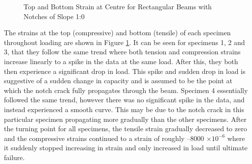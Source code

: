 \documentclass[11pt,a4paper]{article}
\numberwithin{equation}{subsection}
\begin{document}
\begin{figure}[h]
	\begin{center}
	\end{center}
	\caption{Top and Bottom Strain at Centre for Rectangular Beams with Notches of Slope 1:0}
	\label{fig:Rect_10_centre}
\end{figure}

\pagebreak

\noindent
The strains at the top (compressive) and bottom (tensile) of each specimen throughout loading are shown in Figure \ref{fig:Rect_10_centre}. It can be seen for specimens 1, 2 and 3, that they follow the same trend where both tension and compression strains increase linearly to a spike in the data at the same load. After this, they both then experience a significant drop in load. This spike and sudden drop in load is suggestive of a sudden change in capacity and is assumed to be the point at which the notch crack fully propagates through the beam. Specimen 4 essentially followed the same trend, however there was no significant spike in the data, and instead experienced a smooth curve. This may be due to the notch crack in this particular specimen propagating more gradually than the other specimens. After the turning point for all specimens, the tensile strain gradually decreased to zero and the compressive strains continued to a strain of roughly --8000 $\times 10^{-6}$ where it suddenly stopped increasing in strain and only increased in load until ultimate failure.
  
\vspace*{\baselineskip}
\end{document}
